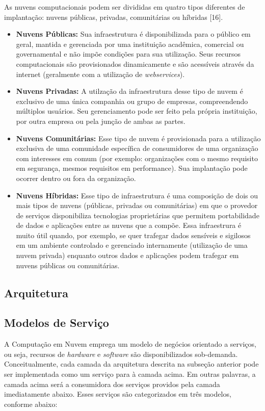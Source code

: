 As nuvens computacionais podem ser divididas em quatro tipos diferentes de implantação: nuvens públicas, privadas, comunitárias ou híbridas [16]. 

\begin{itemize}
	\item \textbf{Nuvens Públicas: } Sua infraestrutura é disponibilizada para o público em geral, mantida e gerenciada por uma instituição acadêmica, comercial ou governamental e não impõe condições para sua utilização. Seus recursos computacionais são provisionados dinamicamente e são acessíveis através da internet (geralmente com a utilização de \textit{webservices}).
	\item \textbf{Nuvens Privadas: } A utilzação da infraestrutura desse tipo de nuvem é exclusivo de uma única companhia ou grupo de empresas, compreendendo múltiplos usuários. Seu gerenciamento pode ser feito pela própria instituição, por outra empresa ou pela junção de ambas as partes.
	\item \textbf{Nuvens Comunitárias: } Esse tipo de nuvem é provisionada para a utilização exclusiva de uma comunidade específica de consumidores de uma organização com interesses em comum (por exemplo: organizações com o mesmo requisito em segurança, mesmos requisitos em performance). Sua implantação pode ocorrer dentro ou fora da organização.
	\item \textbf{Nuvens Híbridas: } Esse tipo de infraestrutura é uma composição de dois ou mais tipos de nuvens (públicas, privadas ou comunitárias) em que o provedor de serviços disponibiliza tecnologias proprietárias que permitem portabilidade de dados e aplicações entre as nuvens que a compõe. Essa infraestrura é muito útil quando, por exemplo, se quer trafegar dados sensíveis e sigilosos em um ambiente controlado e gerenciado internamente (utilização de uma nuvem privada) enquanto outros dados e aplicações podem trafegar em nuvens públicas ou comunitárias.
\end{itemize}

\subsection{Arquitetura} \label{cap2sec2subsec3}

\subsection{Modelos de Serviço} \label{cap2sec2subsec4}

A Computação em Nuvem emprega um modelo de negócios orientado a serviços, ou seja, recursos de \textit{hardware} e \textit{software} são disponibilizados sob-demanda. Conceitualmente, cada camada da arquitetura descrita na subseção anterior pode ser implementada como um serviço para à camada acima. Em outras palavras, a camada acima será a consumidora dos serviços providos pela camada imediatamente abaixo. Esses serviços são categorizados em três modelos, conforme abaixo: 

